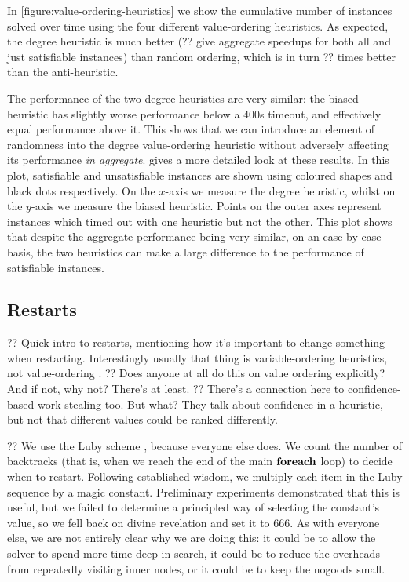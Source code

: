 \documentclass{article}
\newcommand{\citet}[1]{\citeauthor{#1} \shortcite{#1}}
\newcommand{\citep}[1]{\cite{#1}}
\begin{document}
In \cref{figure:value-ordering-heuristics} we show the cumulative number of instances solved over
time using the four different value-ordering heuristics. As expected, the degree heuristic is much
better (?? give aggregate speedups for both all and just satisfiable instances) than random
ordering, which is in turn ?? times better than the anti-heuristic.

The performance of the two degree heuristics are very similar: the
biased heuristic has slightly worse performance below a 400s timeout, and effectively equal
performance above it. This shows that we can introduce an element of randomness into the degree
value-ordering heuristic without adversely affecting its performance \emph{in aggregate}.
 gives a more detailed look at these results. In this plot,
satisfiable and unsatisfiable instances are shown using coloured shapes and black dots respectively.
On the $x$-axis we measure the degree heuristic, whilst on the $y$-axis we measure the biased
heuristic. Points on the outer axes represent instances which timed out with one heuristic but not
the other.  This plot shows that despite the aggregate performance being very similar, on an case by
case basis, the two heuristics can make a large difference to the performance of satisfiable
instances.

\subsection{Restarts}

?? Quick intro to restarts, mentioning how it's important to change something when restarting.
Interestingly usually that thing is variable-ordering heuristics, not value-ordering
\citep{DBLP:conf/ijcai/LecoutreSTV07,DBLP:journals/jsat/LecoutreSTV07,DBLP:conf/cp/GayHLS15,DBLP:conf/aaai/LeeSZ16,DBLP:conf/cp/GlorianBLLM17}.
?? Does anyone at all do this on value ordering explicitly? And if not, why not? There's
\citet{DBLP:conf/flairs/RazgonOP07} at least. ?? There's a connection here to confidence-based work
stealing \citep{DBLP:conf/cp/ChuSS09} too. But what? They talk about confidence in a heuristic, but
not that different values could be ranked differently.

?? We use the Luby scheme \citep{DBLP:journals/ipl/LubySZ93}, because everyone else does. We count
the number of backtracks (that is, when we reach the end of the main $\KwSty{foreach}$ loop) to
decide when to restart. Following established wisdom, we multiply each item in the Luby sequence by
a magic constant. Preliminary experiments demonstrated that this is useful, but we failed to
determine a principled way of selecting the constant's value, so we fell back on divine revelation
and set it to 666. As with everyone else, we are not entirely clear why we are doing this: it could
be to allow the solver to spend more time deep in search, it could be to reduce the overheads from
repeatedly visiting inner nodes, or it could be to keep the nogoods small.
\end{document}
